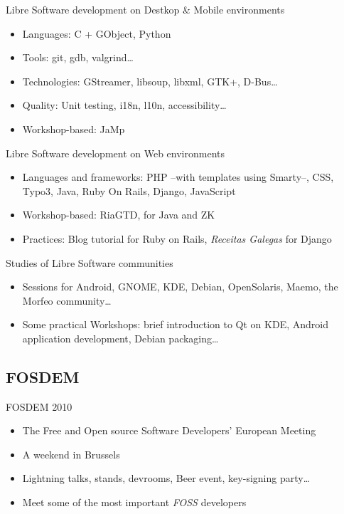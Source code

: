 \documentclass{beamer}
\begin{document}
\begin{frame}{Libre Software development on Destkop \& Mobile environments}
\begin{itemize}
  \item Languages: C + GObject, Python
  \item Tools: git, gdb, valgrind\dots
  \item Technologies: GStreamer, libsoup, libxml, GTK+, D-Bus\dots
  \item Quality: Unit testing, i18n, l10n, accessibility\dots
  \item Workshop-based: JaMp
\end{itemize}
\end{frame}

\begin{frame}{Libre Software development on Web environments}
\begin{itemize}
  \item Languages and frameworks: PHP --with templates using Smarty--, CSS, Typo3, Java, Ruby On Rails, Django, JavaScript
  \item Workshop-based: RiaGTD, for Java and ZK
  \item Practices: Blog tutorial for Ruby on Rails, {\it Receitas Galegas} for Django
\end{itemize}
\end{frame}

\begin{frame}{Studies of Libre Software communities}
\begin{itemize}
  \item Sessions for Android, GNOME, KDE, Debian, OpenSolaris, Maemo, the Morfeo community\dots
  \item Some practical Workshops: brief introduction to Qt on KDE, Android application development, Debian packaging\dots
\end{itemize}
\end{frame}

\subsection{FOSDEM}

\begin{frame}{FOSDEM 2010}
\begin{itemize}
  \item The Free and Open source Software Developers' European Meeting
  \item A weekend in Brussels
  \item Lightning talks, stands, devrooms, Beer event, key-signing party\dots
  \item Meet some of the most important {\it FOSS} developers
\end{itemize}
\end{frame}
\end{document}
